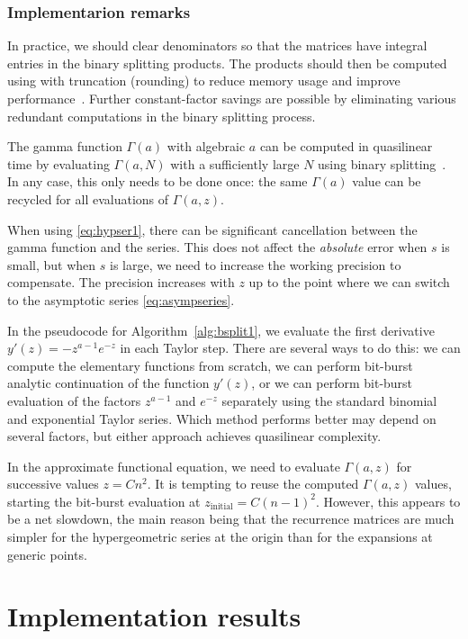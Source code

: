 \documentclass[reqno]{amsart}
\theoremstyle{definition}
\begin{document}
\subsubsection{Implementarion remarks}

In practice, we should clear denominators so that the matrices
have integral entries in the binary splitting products.
The products should then be computed using with truncation (rounding)
to reduce memory usage and improve performance~\cite{mezzarobba2012note}.
Further constant-factor savings are possible by eliminating
various redundant computations in the
binary splitting process.

The gamma function $\Gamma(a)$ with algebraic $a$ can be computed in quasilinear
time by evaluating $\Gamma(a,N)$ with a sufficiently large $N$
using binary splitting~\cite{Brent1976,johansson2021arbitrary}.
In any case, this only needs to be done once: the same $\Gamma(a)$
value can be recycled for all evaluations of $\Gamma(a,z)$.

When using \eqref{eq:hypser1}, there can be significant
cancellation between the gamma function and the series.
This does not affect the \emph{absolute} error when $s$
is small, but when $s$ is large, we need to increase the working
precision to compensate. The precision increases with $z$
up to the point where we can switch to the asymptotic series
\eqref{eq:asympseries}.

In the pseudocode for Algorithm~\ref{alg:bsplit1}, we evaluate the first derivative
$y'(z) = -z^{a-1} e^{-z}$ in each Taylor step. There are several ways
to do this: we can compute the elementary functions from scratch,
we can perform bit-burst analytic continuation
of the function $y'(z)$, or we can perform bit-burst evaluation
of the factors $z^{a-1}$ and $e^{-z}$ separately
using the standard binomial and exponential Taylor series.
Which method performs better may depend on several factors,
but either approach achieves quasilinear complexity.

In the approximate functional equation, we need to evaluate $\Gamma(a,z)$
for successive values $z = C n^2$.
It is tempting to reuse the computed $\Gamma(a,z)$ values,
starting the bit-burst evaluation at $z_{\text{initial}} = C (n-1)^2$.
However, this appears to be a net slowdown,
the main reason being that the recurrence matrices
are much simpler for the hypergeometric series at the origin
than for the expansions at generic points.


\section{Implementation results}
\end{document}
